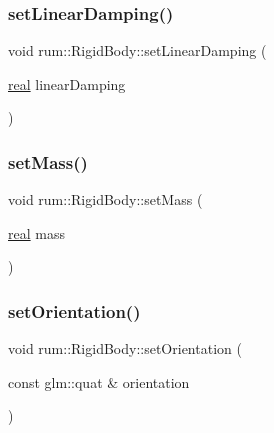 \mbox{\label{classrum_1_1_rigid_body_a95cdc17498c69170c32231fb35ba4cdd}} 
\subsubsection{\texorpdfstring{set\+Linear\+Damping()}{setLinearDamping()}}
{\footnotesize\ttfamily void rum\+::\+Rigid\+Body\+::set\+Linear\+Damping (\begin{DoxyParamCaption}\item[{\mbox{\hyperlink{namespacerum_a7e8cca23573d5eaead0f138cbaa4862c}{real}}}]{linear\+Damping }\end{DoxyParamCaption})}

\mbox{\label{classrum_1_1_rigid_body_ae12c446bc4f73154e049ba176d89c6d8}} 
\subsubsection{\texorpdfstring{set\+Mass()}{setMass()}}
{\footnotesize\ttfamily void rum\+::\+Rigid\+Body\+::set\+Mass (\begin{DoxyParamCaption}\item[{\mbox{\hyperlink{namespacerum_a7e8cca23573d5eaead0f138cbaa4862c}{real}}}]{mass }\end{DoxyParamCaption})}

\mbox{\label{classrum_1_1_rigid_body_a2f4565f3884f4870403a2f6000860a81}} 
\subsubsection{\texorpdfstring{set\+Orientation()}{setOrientation()}\hspace{0.1cm}{\footnotesize\ttfamily [1/2]}}
{\footnotesize\ttfamily void rum\+::\+Rigid\+Body\+::set\+Orientation (\begin{DoxyParamCaption}\item[{const glm\+::quat \&}]{orientation }\end{DoxyParamCaption})}

